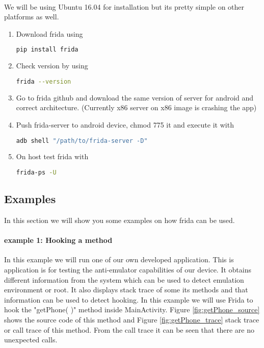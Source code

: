 \documentclass[../main.tex]{subfile}
\begin{document}
	\paragraph{} We will be using Ubuntu 16.04 for installation but its pretty simple on other platforms as well.
	\begin{enumerate}
		\item Download frida using
			\begin{lstlisting}[language=bash, numbers=none]
				pip install frida
			\end{lstlisting}
		
		\item Check version by using
			\begin{lstlisting}[language=bash, numbers=none]
				frida --version
			\end{lstlisting}
		\item Go to frida github and download the same version of server for android and correct architecture. (Currently x86 server on x86 image
		is crashing the app)
		\item Push frida-server to android device, chmod 775 it and execute it with
			\begin{lstlisting}[language=bash, numbers=none]
				adb shell "/path/to/frida-server -D"
			\end{lstlisting}
		\item On host test frida with
			\begin{lstlisting}[language=bash, numbers=none]
				frida-ps -U
			\end{lstlisting}
	\end{enumerate}

	\subsection{Examples}
	In this section we will show you some examples on how frida can be used.

	\paragraph{example 1: Hooking a method} \label{sec::hooking} In this example we will run one of our own developed application. This is application is for testing the anti-emulator capabilities of our device. It obtains different information from the system which can be used to detect emulation environment or root. It also displays stack trace of some its methods and that information can be used to detect hooking. In this example we will use Frida to hook the "getPhone( )" method inside MainActivity. Figure \ref{fig:getPhone_source} shows the source code of this method and Figure \ref{fig:getPhone_trace} stack trace or call trace of this method. From the call trace it can be seen that there are no unexpected calls.
	
\end{document}
